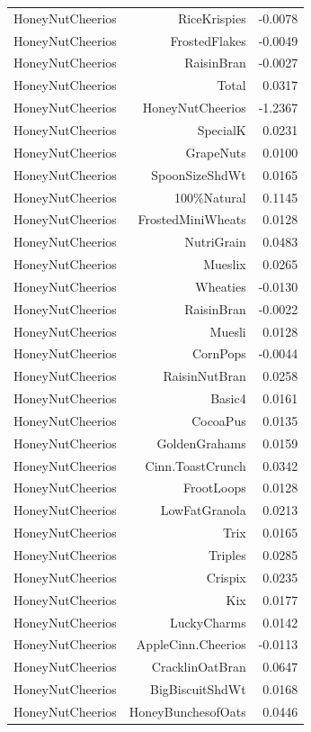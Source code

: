 \begin{longtable}{@{}lrr@{}}
HoneyNutCheerios & RiceKrispies & -0.0078 \\
HoneyNutCheerios & FrostedFlakes & -0.0049 \\
HoneyNutCheerios & RaisinBran & -0.0027 \\
HoneyNutCheerios & Total & 0.0317 \\
HoneyNutCheerios & HoneyNutCheerios & -1.2367 \\
HoneyNutCheerios & SpecialK & 0.0231 \\
HoneyNutCheerios & GrapeNuts & 0.0100 \\
HoneyNutCheerios & SpoonSizeShdWt & 0.0165 \\
HoneyNutCheerios & 100\%Natural & 0.1145 \\
HoneyNutCheerios & FrostedMiniWheats & 0.0128 \\
HoneyNutCheerios & NutriGrain & 0.0483 \\
HoneyNutCheerios & Mueslix & 0.0265 \\
HoneyNutCheerios & Wheaties & -0.0130 \\
HoneyNutCheerios & RaisinBran & -0.0022 \\
HoneyNutCheerios & Muesli & 0.0128 \\
HoneyNutCheerios & CornPops & -0.0044 \\
HoneyNutCheerios & RaisinNutBran & 0.0258 \\
HoneyNutCheerios & Basic4 & 0.0161 \\
HoneyNutCheerios & CocoaPus & 0.0135 \\
HoneyNutCheerios & GoldenGrahams & 0.0159 \\
HoneyNutCheerios & Cinn.ToastCrunch & 0.0342 \\
HoneyNutCheerios & FrootLoops & 0.0128 \\
HoneyNutCheerios & LowFatGranola & 0.0213 \\
HoneyNutCheerios & Trix & 0.0165 \\
HoneyNutCheerios & Triples & 0.0285 \\
HoneyNutCheerios & Crispix & 0.0235 \\
HoneyNutCheerios & Kix & 0.0177 \\
HoneyNutCheerios & LuckyCharms & 0.0142 \\
HoneyNutCheerios & AppleCinn.Cheerios & -0.0113 \\
HoneyNutCheerios & CracklinOatBran & 0.0647 \\
HoneyNutCheerios & BigBiscuitShdWt & 0.0168 \\
HoneyNutCheerios & HoneyBunchesofOats & 0.0446 \\

\end{longtable}
